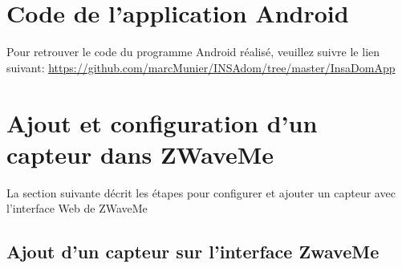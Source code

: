 \section{Code de l'application Android}

Pour retrouver le code du programme Android réalisé, veuillez suivre le lien suivant:  \url{https://github.com/marcMunier/INSAdom/tree/master/InsaDomApp}


\section{ Ajout et configuration d'un capteur dans ZWaveMe}

La section suivante décrit les étapes pour configurer et ajouter un capteur avec l'interface Web de ZWaveMe


\subsection{Ajout d'un capteur sur l'interface ZwaveMe}

